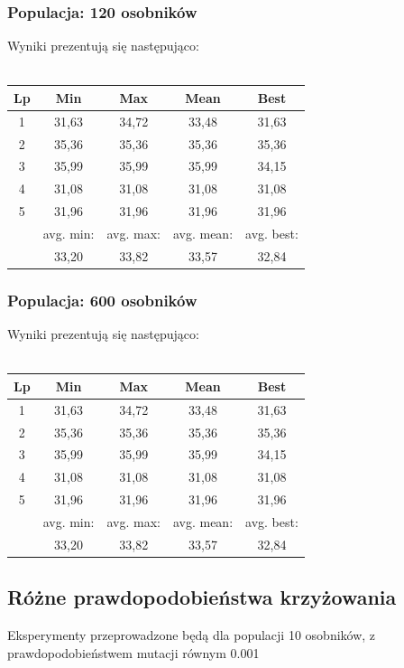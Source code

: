 \documentclass[a4paper,11pt]{article}
\begin{document}
			\subsubsection{Populacja: 120 osobników}
				Wyniki prezentują się następująco:\\~\\
				\begin{tabular}{|c|c|c|c|c|}
					\hline 
					Lp & Min & Max & Mean & Best \\
					\hline
					1 & 31,63  & 34,72 & 33,48 & 31,63\\\hline
					2 & 35,36 & 35,36  &35,36 & 35,36 \\\hline
					3 & 35,99 & 35,99  & 35,99 &34,15 \\\hline
					4 & 31,08 & 31,08  & 31,08& 31,08 \\\hline
					5 & 31,96 & 31,96  & 31,96 & 31,96\\\hline
					&avg. min:&avg. max:&avg. mean:&avg. best:\\\hline
					& 33,20 & 33,82& 33,57 &32,84\\\hline
				\end{tabular} 
			\subsubsection{Populacja: 600 osobników}
				Wyniki prezentują się następująco:\\~\\
				\begin{tabular}{|c|c|c|c|c|}
					\hline 
					Lp & Min & Max & Mean & Best \\
					\hline
					1 & 31,63  & 34,72 & 33,48 & 31,63\\\hline
					2 & 35,36 & 35,36  &35,36 & 35,36 \\\hline
					3 & 35,99 & 35,99  & 35,99 &34,15 \\\hline
					4 & 31,08 & 31,08  & 31,08& 31,08 \\\hline
					5 & 31,96 & 31,96  & 31,96 & 31,96\\\hline
					&avg. min:&avg. max:&avg. mean:&avg. best:\\\hline
					& 33,20 & 33,82& 33,57 &32,84\\\hline
				\end{tabular} 
			\subsection{Różne prawdopodobieństwa krzyżowania}
				Eksperymenty przeprowadzone będą dla populacji 10 osobników, z prawdopodobieństwem mutacji równym 0.001
\end{document}
